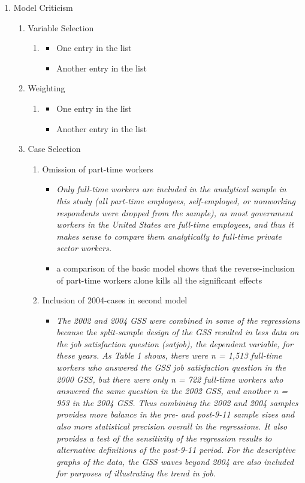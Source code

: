 \documentclass[a4paper,man,natbib]{apa6}
\begin{document}
\begin{enumerate}
\begin{enumerate}
	\item Model Criticism
	\begin{enumerate}
		\item Variable Selection
		\begin{enumerate}
			\item 
			\begin{itemize}
				\item One entry in the list
				\item Another entry in the list
			\end{itemize}
		\end{enumerate}
		\item Weighting
		\begin{enumerate}
			\item 
			\begin{itemize}
				\item One entry in the list
				\item Another entry in the list
			\end{itemize}
		\end{enumerate}
		\item Case Selection
		\begin{enumerate}
			\item Omission of part-time workers 
			\begin{itemize}
				\item 
				\textit{Only full-time workers are included in the analytical sample in this study (all part-time employees, self-employed, or nonworking respondents were dropped from the sample), as most government workers in the United States are full-time employees, and thus it makes sense to compare them analytically to full-time private sector workers.}
				\item 
				a comparison of the basic model shows that the reverse-inclusion of part-time workers alone kills all the significant effects
			\end{itemize}
			\item Inclusion of 2004-cases in second model
			\begin{itemize}
				\item 
				\textit{The 2002 and 2004 GSS were combined in some of the regressions because the split-sample design of the GSS resulted in less data on the job satisfaction question (satjob), the dependent variable, for these years. As Table 1 shows, there were n = 1,513 full-time workers who answered the GSS job satisfaction question in the 2000 GSS, but there were only n = 722 full-time workers who answered the same question in the 2002 GSS, and another n = 953 in the 2004 GSS. Thus combining the 2002 and 2004 samples provides more balance in the pre- and post-9-11 sample sizes and also more statistical precision overall in the regressions. It also provides a test of the sensitivity of the regression results to alternative definitions of the post-9-11 period. For the descriptive graphs of the data, the GSS waves beyond 2004 are also included for purposes of illustrating the trend in job.}

\end{itemize}
\end{enumerate}
\end{enumerate}
\end{enumerate}
\end{enumerate}
\end{document}
